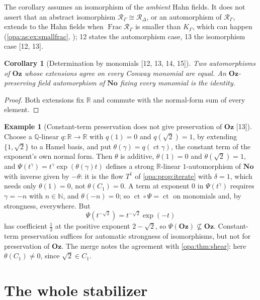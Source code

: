 \documentclass[11pt,oneside]{article}
\numberwithin{equation}{section}
\newtheorem{corollary}[corollary]{Corollary}
\theoremstyle{definition}
\newtheorem{example}[example]{Example}
\theoremstyle{remark}
\newcommand{\No}{\mathbf{No}}
\newcommand{\Oz}{\mathbf{Oz}}
\newcommand{\R}{\mathbb R}
\newcommand{\Q}{\mathbb Q}
\newcommand{\N}{\mathbb N}
\newcommand{\ct}{\operatorname{ct}}
\newcommand{\Frac}{\operatorname{Frac}}
\newcommand{\src}[1]{\textup{\textsf{\small[#1]}}}
\begin{document}
The corollary assumes an isomorphism of the \emph{ambient} Hahn fields. It does not
assert that an abstract isomorphism $\mathcal R_\Gamma\cong\mathcal R_\Delta$, or an
automorphism of $\mathcal R_\Gamma$, extends to the Hahn fields when $\Frac\mathcal
R_\Gamma$ is smaller than $K_\Gamma$, which can happen (\cref{opa:as:ex:smallfrac},
\cite[Proposition 2.4.5]{LM}); 12 states the automorphism case, 13 the isomorphism case
\src{12, 13}.

\begin{corollary}[Determination by monomials \src{12, 13, 14, 15}]\label{opa:as:cor:monodet}
Two automorphisms of $\Oz$ whose extensions agree on every Conway monomial are equal. An
$\Oz$-preserving field automorphism of $\No$ fixing every monomial is the identity.
\end{corollary}
\begin{proof}
Both extensions fix $\R$ and commute with the normal-form sum of every element.
\end{proof}

\begin{example}[Constant-term preservation does not give preservation of $\Oz$ \src{13}]\label{opa:as:ex:ctnotOz}
Choose a $\Q$-linear $q:\R\to\R$ with $q(1)=0$ and $q(\sqrt2)=1$, by extending
$\{1,\sqrt2\}$ to a Hamel basis, and put $\theta(\gamma)=q(\ct\gamma)$, the constant term
of the exponent's own normal form. Then $\theta$ is additive, $\theta(1)=0$ and
$\theta(\sqrt2)=1$, and $\Psi(t^\gamma)=t^\gamma\exp(\theta(\gamma)t)$ defines a strong
$\R$-linear $1$-automorphism of $\No$ with inverse given by $-\theta$: it is the flow
$T^1$ of \cref{opa:prop:iterate} with $\delta=1$, which needs only $\theta(1)=0$, not
$\theta(C_1)=0$. A term at exponent $0$ in $\Psi(t^\gamma)$ requires $\gamma=-n$ with
$n\in\N$, and $\theta(-n)=0$; so $\ct\circ\Psi=\ct$ on monomials and, by strongness,
everywhere. But
\[
 \Psi(t^{-\sqrt2})=t^{-\sqrt2}\exp(-t)
\]
has coefficient $\tfrac12$ at the positive exponent $2-\sqrt2$, so $\Psi(\Oz)\not\subseteq\Oz$.
Constant-term preservation suffices for automatic strongness of isomorphisms, but not for
preservation of $\Oz$. The merge notes the agreement with \cref{opa:thm:shear}: here
$\theta(C_1)\ne0$, since $\sqrt2\in C_1$.
\end{example}

\section{The whole stabilizer}\label{opa:as:sec:factor}
\end{document}
